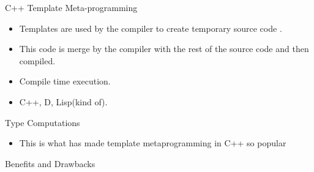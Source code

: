 \begin{frame}{C++ Template Meta-programming}
    \begin{itemize}
        \item Templates are used by the compiler to create temporary source code
            \cite{wikiTM}.

        \item This code is merge by the compiler with the rest of the source code
            and then compiled\cite{wikiTM}.

        \item Compile time execution\cite{wikiTM}.

        \item C++, D, Lisp(kind of)\cite{wikiTM}.
    \end{itemize}
\end{frame}



\begin{frame}{Type Computations}
    \begin{itemize}
        \item This is what has made template metaprogramming in C++ so popular
    \end{itemize}
\end{frame}

\begin{frame}{Benefits and Drawbacks}
\end{frame}





